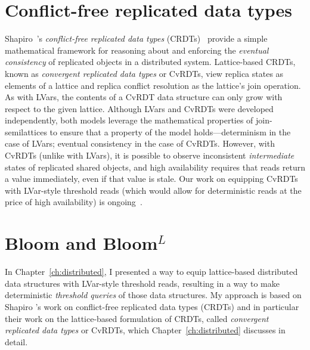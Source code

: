 \ifdefined\JOURNAL
\section{Conflict-free replicated data types}

Shapiro~\etal's \emph{conflict-free replicated data types}
(CRDTs)~ provide a simple mathematical framework
for reasoning about and enforcing the \emph{eventual consistency} of
replicated objects in a distributed system.  Lattice-based CRDTs,
known as \emph{convergent replicated data types} or CvRDTs, view
replica states as elements of a lattice and replica conflict
resolution as the lattice's join operation.  As with LVars, the
contents of a CvRDT data structure can only grow with respect to the
given lattice.  Although LVars and CvRDTs were developed
independently, both models leverage the mathematical properties of
join-semilattices to ensure that a property of the model
holds---determinism in the case of LVars; eventual consistency in the
case of CvRDTs.  However, with CvRDTs (unlike with LVars), it is
possible to observe inconsistent \emph{intermediate} states of
replicated shared objects, and high availability requires that reads
return a value immediately, even if that value is stale.  Our work on
equipping CvRDTs with LVar-style threshold reads (which would allow
for deterministic reads at the price of high availability) is
ongoing~\cite{joining-wodet, lvars-dissertation}.
\fi

\section{Bloom and Bloom$^L$}

\ifdefined\DISSERTATION
In Chapter~\ref{ch:distributed}, I presented a way to equip
lattice-based distributed data structures with LVar-style threshold
reads, resulting in a way to make deterministic \emph{threshold
  queries} of those data structures.  My approach is based on Shapiro
\etal's work on conflict-free replicated data types (CRDTs)
\cite{crdts,crdts-tr} and in particular their work on the
lattice-based formulation of CRDTs, called \emph{convergent replicated
  data types} or CvRDTs, which Chapter~\ref{ch:distributed} discusses
in detail.
\fi

